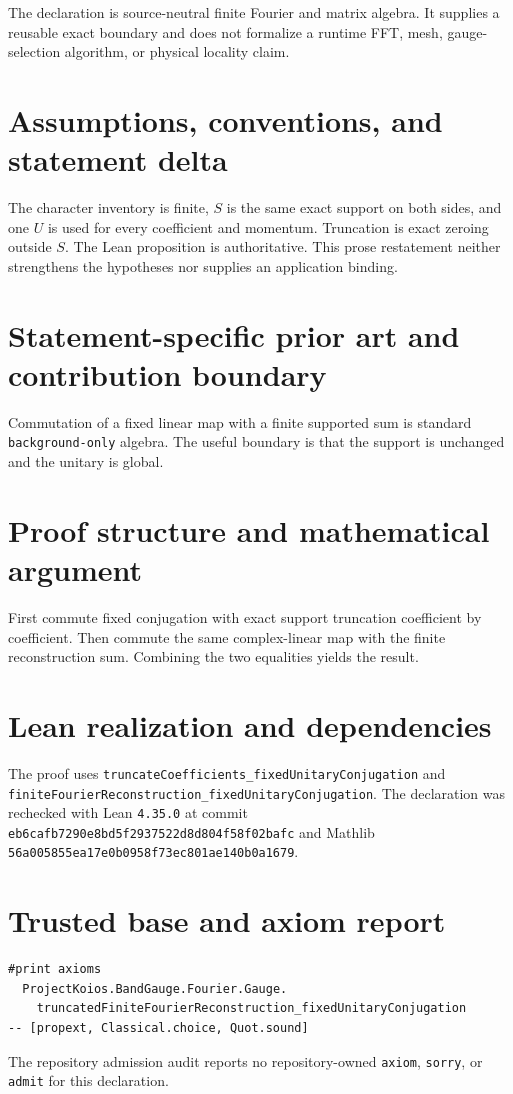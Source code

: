 \documentclass[11pt]{article}
\begin{document}
The declaration is source-neutral finite Fourier and matrix algebra.  It supplies a reusable exact boundary and does not formalize a runtime FFT, mesh, gauge-selection algorithm, or physical locality claim.

\section{Assumptions, conventions, and statement delta}
The character inventory is finite, $S$ is the same exact support on both sides, and one $U$ is used for every coefficient and momentum.  Truncation is exact zeroing outside $S$.
The Lean proposition is authoritative.  This prose restatement neither strengthens the hypotheses
nor supplies an application binding.

\section{Statement-specific prior art and contribution boundary}
Commutation of a fixed linear map with a finite supported sum is standard \texttt{background-only} algebra.  The useful boundary is that the support is unchanged and the unitary is global.

\section{Proof structure and mathematical argument}
First commute fixed conjugation with exact support truncation coefficient by coefficient.  Then commute the same complex-linear map with the finite reconstruction sum.  Combining the two equalities yields the result.

\section{Lean realization and dependencies}
The proof uses \texttt{truncateCoefficients\_fixedUnitaryConjugation} and \texttt{finiteFourierReconstruction\_fixedUnitaryConjugation}.  The declaration was rechecked with Lean \texttt{4.35.0} at commit \texttt{eb6cafb7290e8bd5f2937522d8d804f58f02bafc} and Mathlib \texttt{56a005855ea17e0b0958f73ec801ae140b0a1679}.

\section{Trusted base and axiom report}
\begin{verbatim}
#print axioms
  ProjectKoios.BandGauge.Fourier.Gauge.
    truncatedFiniteFourierReconstruction_fixedUnitaryConjugation
-- [propext, Classical.choice, Quot.sound]
\end{verbatim}
The repository admission audit reports no repository-owned \texttt{axiom}, \texttt{sorry}, or
\texttt{admit} for this declaration.
\end{document}
